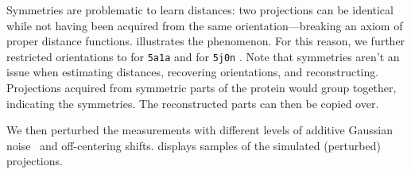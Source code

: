 Symmetries are problematic to learn distances: two projections can be identical while not having been acquired from the same orientation---breaking an axiom of proper distance functions.
 illustrates the phenomenon.
For this reason, we further restricted orientations to \banjac{$(\theta_3,\theta_2,\theta_1) \in [0, 2\pi[ \;  \times \; [0, \pi[ \; \times \; [0, \frac{\pi}{2}[ \; $} for \texttt{5a1a} and \banjac{$(\theta_3,\theta_2,\theta_1) \in [0, 2\pi[ \; \times [0, \frac{\pi}{2}[ \; \times \; [0, 2\pi[ $} for \texttt{5j0n} .
Note that symmetries aren't an issue when estimating distances, recovering orientations, and reconstructing.
Projections acquired from symmetric parts of the protein would group together, indicating the symmetries.
The reconstructed parts can then be copied over.

We then perturbed the measurements with different levels of additive Gaussian noise~\cite{sorzano2004normalizing,shigematsu2013noise} and off-centering shifts. %
 displays samples of the simulated (perturbed) projections.

